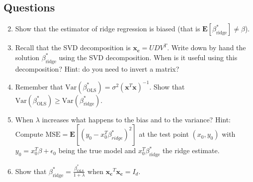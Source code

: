 \documentclass{article}
\begin{document}
    \subsection*{Questions}
    \begin{enumerate}
        \setcounter{enumi}{1}

        \item Show that the estimator of ridge regression is biased (that is $\mathbf{E}[\beta^*_{\text{ridge}}] \neq \beta$).

        \item Recall that the SVD decomposition is $\mathbf{x_c} = UDV^T$. Write down by hand the solution $\beta^*_{\text{ridge}}$ using the SVD decomposition. When is it useful using this decomposition? Hint: do you need to invert a matrix?

        \item Remember that $\text{Var}(\beta^*_{\text{OLS}}) = \sigma^2 {(\mathbf{x}^T \mathbf{x})}^{-1}$. Show that $\text{Var}(\beta^*_{\text{OLS}}) \geq \text{Var}(\beta^*_{\text{ridge}})$.

        \item When $\lambda$ increases what happens to the bias and to the variance? Hint: Compute $\text{MSE} = \mathbf{E}[{(y_0 - x_0^T \beta^*_{ridge})}^2]$ at the test point $(x_0, y_0)$ with $y_0 = x_0^T \beta + \epsilon_0$ being the true model and $x_0^T \beta^*_{\text{ridge}}$ the ridge estimate.

        \item Show that $\beta^*_{\text{ridge}} = \frac{\beta^*_{\text{OLS}}}{1+\lambda}$ when $\mathbf{x_c}^T \mathbf{x_c} = I_d$.
    \end{enumerate}
\end{document}
